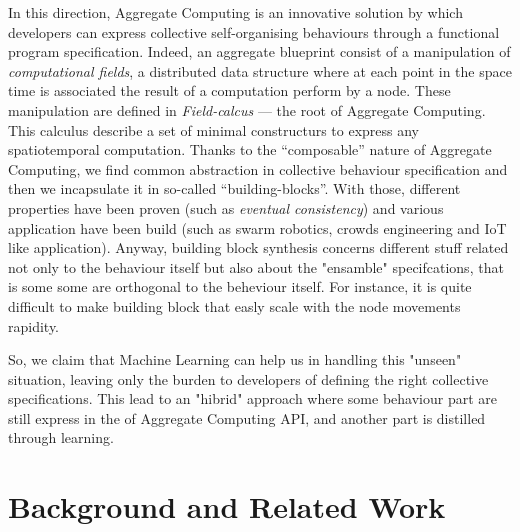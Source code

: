 \documentclass[
twocolumn,
]{ceurart}
\begin{document}
In this direction, Aggregate Computing is an innovative solution by which 
 developers can express collective self-organising behaviours through a functional program specification.
%
Indeed, an aggregate blueprint consist of a manipulation of \textit{computational fields}, a distributed
 data structure where at each point in the space time is associated the result of a computation
 perform by a node.
%
These manipulation are defined in \textit{Field-calcus} --- the root of Aggregate Computing. 
 This calculus describe a set of minimal constructurs to express any spatiotemporal computation.
%
Thanks to the ``composable'' nature of Aggregate Computing, we find common abstraction 
 in collective behaviour specification and then we incapsulate it in so-called ``building-blocks''.
%
With those, different properties have been proven (such as \textit{eventual consistency}) and various
 application have been build (such as swarm robotics, crowds engineering and IoT like application).
%
Anyway, building block synthesis concerns different stuff related not only to the behaviour itself
 but also about the "ensamble" specifcations, that is some some are orthogonal to the
 beheviour itself. For instance, it is quite difficult to make building block
 that easly scale with the node movements rapidity.
%

So, we claim that Machine Learning can help us in handling this "unseen" situation, leaving only the burden
 to developers of defining the right collective specifications.
%
This lead to an "hibrid" approach where some behaviour part are still express in the of Aggregate Computing
 API, and another part is distilled through learning.


\section{Background and Related Work}
\end{document}
